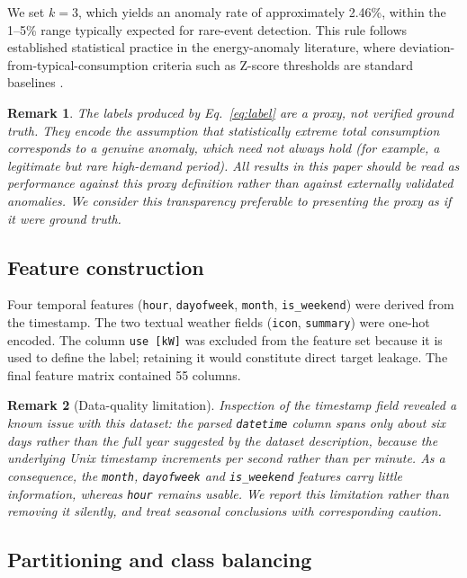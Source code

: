 \documentclass[pdflatex,sn-mathphys-num]{sn-jnl}%
\theoremstyle{thmstyleone}%
\theoremstyle{thmstyletwo}%
\newtheorem{remark}{Remark}%
\theoremstyle{thmstylethree}%
\begin{document}
We set $k = 3$, which yields an anomaly rate of approximately 2.46\%, within the 1--5\% range typically expected for rare-event detection. This rule follows established statistical practice in the energy-anomaly literature, where deviation-from-typical-consumption criteria such as Z-score thresholds are standard baselines \cite{abnormality2024,ambat2025}.

\begin{remark}
The labels produced by Eq.~\eqref{eq:label} are a \emph{proxy}, not verified ground truth. They encode the assumption that statistically extreme total consumption corresponds to a genuine anomaly, which need not always hold (for example, a legitimate but rare high-demand period). All results in this paper should be read as performance against this proxy definition rather than against externally validated anomalies. We consider this transparency preferable to presenting the proxy as if it were ground truth.
\end{remark}

\subsection{Feature construction}\label{subsec:feat}

Four temporal features (\texttt{hour}, \texttt{dayofweek}, \texttt{month}, \texttt{is\_weekend}) were derived from the timestamp. The two textual weather fields (\texttt{icon}, \texttt{summary}) were one-hot encoded. The column \texttt{use [kW]} was excluded from the feature set because it is used to define the label; retaining it would constitute direct target leakage. The final feature matrix contained 55 columns.

\begin{remark}[Data-quality limitation]
Inspection of the timestamp field revealed a known issue with this dataset: the parsed \texttt{datetime} column spans only about six days rather than the full year suggested by the dataset description, because the underlying Unix timestamp increments per second rather than per minute. As a consequence, the \texttt{month}, \texttt{dayofweek} and \texttt{is\_weekend} features carry little information, whereas \texttt{hour} remains usable. We report this limitation rather than removing it silently, and treat seasonal conclusions with corresponding caution.
\end{remark}

\subsection{Partitioning and class balancing}\label{subsec:split}
\end{document}
